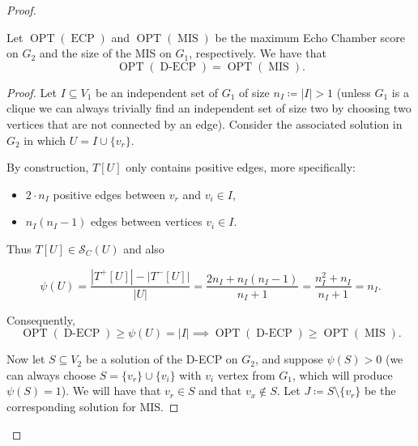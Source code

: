 \begin{proof}
	\begin{claim}
		\label{th:opt-equality-densest}
		Let $\operatorname{OPT}(\operatorname{ECP})$ and
		$\operatorname{OPT}(\operatorname{MIS})$ be the maximum Echo Chamber score on
		$G_2$ and the size of the MIS on $G_1$, respectively.
		We have that
		\begin{equation}
			\operatorname{OPT}(\operatorname{D-ECP}) =
			\operatorname{OPT}(\operatorname{MIS}).
		\end{equation}
	\end{claim}

	\begin{proof}
		Let $I \subseteq V_{1} $ be an independent set of $G_1$ of size $n_{I}
			\coloneqq |I| > 1$ (unless $G_1$ is a clique we can always trivially find an independent set of
		size two by choosing two vertices that are not
		connected by an edge). Consider the associated solution in $G_2$ in
		which $U = I \cup \{v_{r} \}$.

		By construction, $T[U]$ only contains positive edges, more
		specifically:
		\begin{itemize}
			\item $2 \cdot n_{I} $ positive edges between $v_{r} $ and $v_{i}
				      \in I$,
			\item $n_{I}(n_{I}  -1)$
			      edges between vertices $v_{i} \in I$.

		\end{itemize}
		Thus $T[U] \in \mathcal{S}_C(U)$ and also

		\begin{equation}
			\label{eq:score-densest-mip}
			\psi(U) = \frac{|T^{+}[U]| - |T^{-}[U]|}{|U|}  = \frac{2n_{I}  +
				n_{I}(n_{I}  -1) }{n_{I} + 1} = \frac{n_{I}^{2} +
				n_{I}}{n_{I} + 1} = n_{I}.
		\end{equation}

		Consequently,
		\begin{equation}
			\operatorname{OPT}(\operatorname{D-ECP}) \geq \psi(U) = |I|
			\implies \operatorname{OPT}(\operatorname{D-ECP}) \geq
			\operatorname{OPT}(\operatorname{MIS}).
		\end{equation}

		Now let $S \subseteq V_2$ be a solution of the \acrshort{D-ECP} on
		$G_2$, and suppose $\psi(S) > 0$ (we can always choose $S = \{ v_r \}
			\cup \{ v_i\}$ with $v_i$ vertex from $G_1$, which will produce
		$\psi(S) = 1$). We will have that
		$v_{r} \in S$ and that $v_{x} \not\in S $. Let $J \coloneqq S \setminus
			\{v_r\}$ be the corresponding solution for MIS.


\end{proof}
\end{proof}
